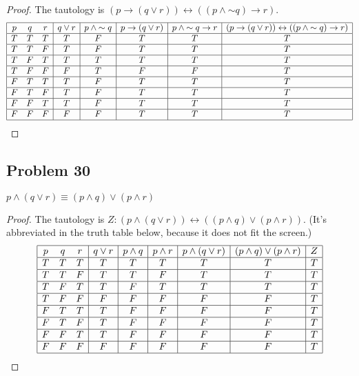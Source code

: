 \documentclass[14pt]{extarticle}
\newcommand{\bic}{\leftrightarrow}
\begin{document}
\begin{proof}
The tautology is $(p \to (q \vee r)) \bic ((p \wedge {\sim q}) \to r)$.
$$
\begin{array}{|ccc|c|c|c|c|c|c|}
\hline
p & q & r &  q \vee r & p \wedge {\sim q} & p \to (q \vee r) & p \wedge {\sim q} \to r & (p \to (q \vee r)) \bic ((p \wedge {\sim q}) \to r) \\
\hline
T & T & T & T & F & T & T & T \\
\hline
T & T & F & T & F & T & T & T \\
\hline
T & F & T & T & T & T & T & T \\
\hline
T & F & F & F & T & F & F & T \\
\hline
F & T & T & T & F & T & T & T \\
\hline
F & T & F & T & F & T & T & T \\
\hline
F & F & T & T & F & T & T & T \\
\hline
F & F & F & F & F & T & T & T \\
\hline
\end{array}
$$
\end{proof}

\subsection{Problem 30}
$p \wedge (q \vee r) \equiv (p \wedge q) \vee (p \wedge r)$

\begin{proof}
The tautology is $Z: (p \wedge (q \vee r)) \bic ((p \wedge q) \vee (p \wedge r))$. (It's abbreviated in the truth table below, because it does not fit the screen.)
$$
\begin{array}{|ccc|c|c|c|c|c|c|}
\hline
p & q & r & q \vee r & p \wedge q & p \wedge r & p \wedge (q \vee r) & (p \wedge q) \vee (p \wedge r) & Z \\
\hline
T & T & T & T & T & T & T & T & T \\
\hline
T & T & F & T & T & F & T & T & T \\
\hline
T & F & T & T & F & T & T & T & T \\
\hline
T & F & F & F & F & F & F & F & T \\
\hline
F & T & T & T & F & F & F & F & T \\
\hline
F & T & F & T & F & F & F & F & T \\
\hline
F & F & T & T & F & F & F & F & T \\
\hline
F & F & F & F & F & F & F & F & T \\
\hline
\end{array}
$$
\end{proof}
\end{document}
